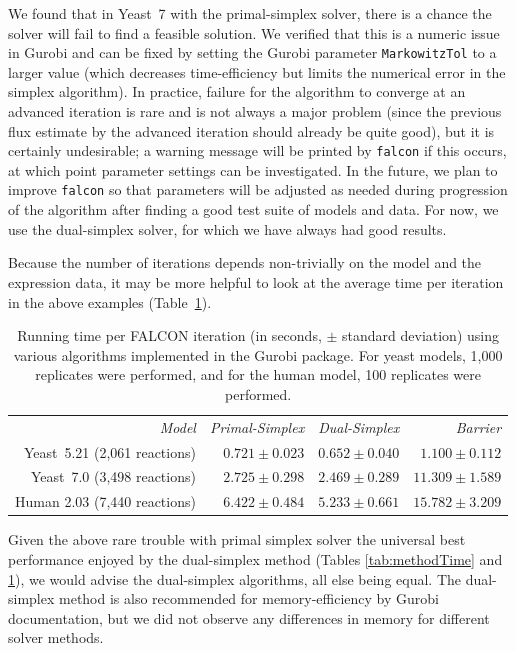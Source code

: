 We found that in Yeast~7 with the primal-simplex solver, there is a
chance the solver will fail to find a feasible solution.
We verified that this is a numeric issue
in Gurobi and can be fixed by setting the Gurobi parameter
\texttt{MarkowitzTol} to a larger value (which decreases
time-efficiency but limits the numerical error in the
simplex algorithm). In practice, failure for the algorithm to converge
at an advanced iteration is rare and is not always a major problem (since the previous
flux estimate by the advanced iteration should already be quite good), but it
is certainly undesirable; a warning message will be printed by
\texttt{falcon} if this occurs, at which point parameter settings can
be investigated. In the future, we plan to improve \texttt{falcon} so
that parameters will be adjusted as needed during progression of the
algorithm after finding a good test suite of models and data. For now,
we use the dual-simplex solver, for which we have always had good
results.

Because the number of iterations depends non-trivially on the model
and the expression data, it may be more helpful to look at the 
average time per iteration in the above examples 
(\suppOrApp Table~\ref{tab:methodTimeIter}).

\begin{table}
\begin{center}
\begin{tabular}{rrrr}
\emph{Model}                 & \emph{Primal-Simplex} & \emph{Dual-Simplex} & \emph{Barrier} \\
Yeast~5.21 (2,061 reactions) & $ 0.721 \pm 0.023 $ & $ 0.652 \pm 0.040 $ & $ 1.100 \pm 0.112  $\\ 
Yeast~7.0 (3,498 reactions)  & $ 2.725 \pm 0.298 $ & $ 2.469 \pm 0.289 $ & $ 11.309 \pm 1.589 $\\
Human 2.03 (7,440 reactions) & $ 6.422 \pm 0.484 $ & $ 5.233 \pm 0.661 $ & $ 15.782 \pm 3.209 $\\ 
\end{tabular}
\end{center}
\caption{Running time per FALCON iteration (in seconds, $\pm$ standard
  deviation) using various algorithms implemented in the Gurobi
  package.  For yeast models, 1,000 replicates were performed, and for
  the human model, 100 replicates were performed.}
\label{tab:methodTimeIter}
\end{table}

Given the above rare trouble with primal simplex solver the universal
best performance enjoyed by the dual-simplex method (\suppOrApp Tables
\ref{tab:methodTime} and \ref{tab:methodTimeIter}), we would advise
the dual-simplex algorithms, all else being equal. The dual-simplex
method is also recommended for memory-efficiency by Gurobi
documentation, but we did not observe any differences in memory for
different solver methods.

